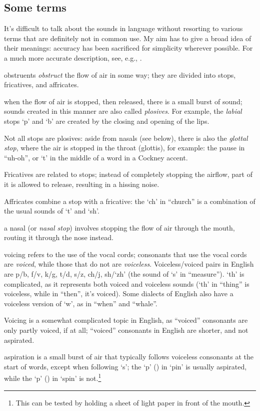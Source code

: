 \subsection{Some terms}


It's difficult to talk about the sounds in language without resorting to various terms that are definitely not in common use. My aim has to give a broad idea of their meanings: accuracy has been sacrificed for simplicity wherever possible. For a much more accurate description, see, e.g., \citet{ladefoged_course_2011}.

\begin{description}[align=left]
\item [obstruent] obstruents \textit{obstruct} the flow of air in some way; they are divided into stops, fricatives, and affricates.
\item [stop] when the flow of air is stopped, then released, there is a small burst of sound; sounds created in this manner are also called \textit{plosives}. For example, the \textit{labial} stops `p' and `b' are created by the closing and opening of the lips.

Not all stops are plosives: aside from nasals (see below), there is also the \textit{glottal stop}, where the air is stopped in the throat (glottis), for example: the pause in ``uh-oh'', or `t' in the middle of a word in a Cockney accent.
\item [fricative] Fricatives are related to stops; instead of completely stopping the airflow, part of it is allowed to release, resulting in a hissing noise.
\item [affricate] Affricates combine a stop with a fricative: the `ch' in ``church'' is a combination of the usual sounds of `t' and `sh'.
\item [nasal] a nasal (or \textit{nasal stop}) involves stopping the flow of air through the mouth, routing it through the nose instead.
\item [voicing] voicing refers to the use of the vocal cords; consonants that use the vocal cords are \textit{voiced}, while those that do not are \textit{voiceless}. Voiceless/voiced pairs in English are p/b, f/v, k/g, t/d, s/z, ch/j, sh/`zh' (the sound of `s' in ``measure''). `th' is complicated, as it represents both voiced and voiceless sounds (`th' in ``thing'' is voiceless, while in ``then'', it's voiced). Some dialects of English also have a voiceless version of `w', as in ``when'' and ``whale''.

Voicing is a somewhat complicated topic in English, as ``voiced'' consonants are only partly voiced, if at all; ``voiced'' consonants in English are shorter, and not aspirated.
\item [aspiration] aspiration is a small burst of air that typically follows voiceless consonants at the start of words, except when following `s'; the `p' (\textipa{[p\super{h}]}) in `pin' is usually aspirated, while the `p' (\textipa{[p]}) in `spin' is not.\footnote{This can be tested by holding a sheet of light paper in front of the mouth.}
\end{description}
